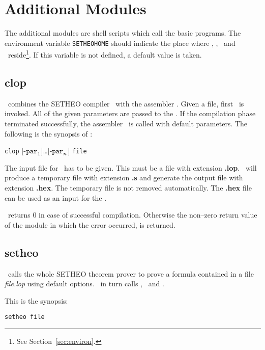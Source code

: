 %
\section{Additional Modules}

The additional modules are shell scripts which call the basic
programs. The environment variable {\tt SETHEOHOME} should indicate
the place where \plop, \inw, \wasm\ and \SAM\ reside\footnote{See
Section~\ref{sec:environ}.}. If this variable is not defined, a
default value is taken. 

\subsection{clop}

\Clop\ combines the SETHEO compiler \inw\ with the
assembler \wasm. Given a file, first \inw\
is invoked. All of the given parameters are passed to the \inw.
If the compilation phase terminated successfully, the
assembler \wasm\ is called with default parameters.
The following is the synopsis of \clop:

{\tt clop} [-$\mbox{\tt par}_1$]\ldots[-$\mbox{\tt par}_n$] {\tt file}

The input file for \clop\ has to be given. This must be a file with
extension {\bf .lop}. \Clop\ will produce a temporary file with
extension {\bf .s} and generate the output file with extension {\bf
.hex}. The temporary file is not removed automatically. The {\bf .hex}
file can be used as an input for the \SAM.

\Clop\ returns $0$ in case of successful compilation.
Otherwise the non--zero return value of the module in which
the error occurred, is returned.



\subsection{setheo}\label{sec:setheo}

\Se\ calls the whole SETHEO theorem prover to prove a formula
contained in a  file  {\it file.lop\/} using default options. \Se\ in turn
calls \inw, \wasm\ and \SAM. 

This is the synopsis:
\begin{verbatim}
setheo file
\end{verbatim}

